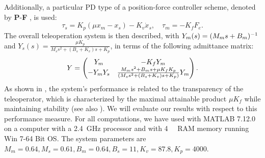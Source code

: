 Additionally, a particular PD type of a position-force controller scheme, denoted 
by \textbf{P}-\textbf{F} , is used:
\[
\tau_s = K_p(\mu x_m-x_s)-K_v \dot{x}_s ,\quad \tau_m = -K_f F_e.
\]
The overall teleoperation system is {then described}, with $Y_m(s) = (M_ms+B_m)^{-1}$ and 
$Y_s(s) = \frac{\mu K_p}{M_s s^2+(B_s+K_v)s+K_p}$, in terms of the following admittance matrix:
\begin{equation}
 Y = \begin{pmatrix}Y_m &- {K_f}Y_m\\ -Y_mY_s&\frac{M_m s^2+B_m s+\mu K_f K_p}{(M_s s^2+(B_s+K_v)s+K_p)}Y_m\end{pmatrix}.
\label{eq:admitsys}
\end{equation}
As shown in \cite{willaert}, the system's performance is related to the transparency of the 
teleoperator, {which is characterized by the maximal} attainable {product $\mu K_f$} while 
maintaining stability (see also \cite{danielmcaree}). We will evaluate our results with respect 
to this performance measure. For all computations, we have used \cite{sdpt3,sedumi,yalmip} 
with MATLAB 7.12.0 on a computer with a \SI{2.4}{\giga\hertz} processor and with 
\SI{4}{\giga\byte} RAM memory running Win 7-64 Bit OS. The system parameters are $M_m=0.64, 
M_s=0.61,B_m=0.64,B_s=11,K_v=87.8,K_p=4000$.

